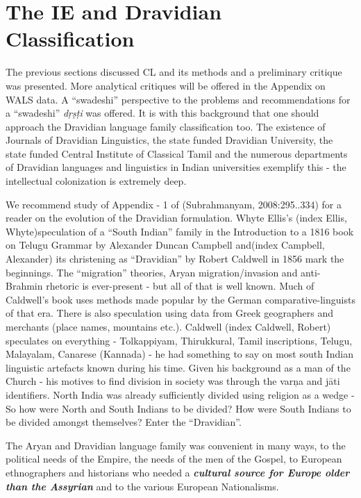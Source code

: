 \section*{The IE and Dravidian Classification}

The previous sections discussed CL and its methods and a preliminary critique was presented. More analytical critiques will be offered in the Appendix on WALS data. A “swadeshi” perspective to the problems and recommendations for a “swadeshi” \textit{dṛṣṭi} was offered. It is with this background that one should approach the Dravidian language family classification too. The existence of Journals of Dravidian Linguistics, the state funded Dravidian University, the state funded Central Institute of Classical Tamil and the numerous departments of Dravidian languages and linguistics in Indian universities exemplify this - the intellectual colonization is extremely deep.

We recommend study of Appendix - 1 of (Subrahmanyam, 2008:295..334) for a reader on the evolution of the Dravidian formulation. Whyte Ellis’s (index Ellis, Whyte)speculation of a “South Indian” family in the Introduction to a 1816 book on Telugu Grammar by Alexander Duncan Campbell and(index Campbell, Alexander) its christening as “Dravidian” by Robert Caldwell in 1856 mark the beginnings. The “migration” theories, Aryan migration/invasion and anti-Brahmin rhetoric is ever-present - but all of that is well known. Much of Caldwell’s book uses methods made popular by the German comparative-linguists of that era. There is also speculation using data from Greek geographers and merchants (place names, mountains etc.). Caldwell (index Caldwell, Robert) speculates on everything - Tolkappiyam, Thirukkural, Tamil inscriptions, Telugu, Malayalam, Canarese (Kannada) - he had something to say on most south Indian linguistic artefacts known during his time. Given his background as a man of the Church - his motives to find division in society was through the varņa and jāti identifiers. North India was already sufficiently divided using religion as a wedge - So how were North and South Indians to be divided? How were South Indians to be divided amongst themselves? Enter the “Dravidian”.

The Aryan and Dravidian language family was convenient in many ways, to the political needs of the Empire, the needs of the men of the Gospel, to European ethnographers and historians who needed a \textbf{\textit{cultural source for Europe older than the Assyrian}} and to the various European Nationalisms.

